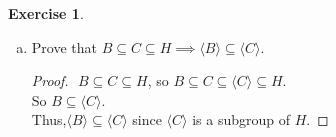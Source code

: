 \documentclass{amsart}
\theoremstyle{plain}
\theoremstyle{definition}
\newtheorem{exer}[lem]{Exercise}
\begin{document}
\begin{exer}
\begin{enumerate}[(a)]
\begin{proof}
		\begin{align*}
			f(x) &= f(a_1^{\epsilon_1}a_2^{\epsilon_2}...a_n^{\epsilon_n}) \\
				 	  &= {f(a_1)}^{\epsilon_1} {f(a_2)}^{\epsilon_2}...{f(a_n)}^{\epsilon_n}\\
				 	  & \in f(A) \subseteq \langle f(A)\rangle
		\end{align*}
		since $f$ is a homomorphism and $f(a_1)^{\epsilon_1},f(a_2)^{\epsilon_2},...,f(a_n)^{\epsilon_n} \in f(A)$.\\
		So we have 
		$$f(\langle A \rangle) \subseteq \langle f(A)\rangle.$$
		Since both of $f(\langle A\rangle)$ and $\langle f(A) \rangle$ are subgroups of $H$,\\
		$f(\langle A\rangle)=\langle f(A)\rangle$
	\end{proof}
\item Prove that $B\subseteq C\subseteq H\implies \langle B\rangle\subseteq\langle C\rangle$.
	\begin{proof}
		$ $\newline
		$B \subseteq C \subseteq H$, so $B\subseteq C \subseteq \langle C \rangle \subseteq H$.\\
		So $B\subseteq \langle C \rangle$.\\
		Thus,$\langle B \rangle \subseteq \langle C \rangle$ since $\langle C \rangle$ is a subgroup of $H$.
	\end{proof}


\end{enumerate}
\end{exer}
\end{document}
